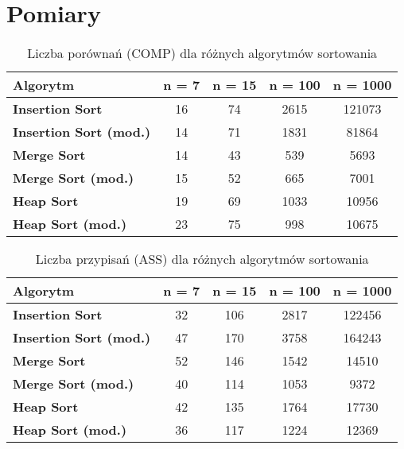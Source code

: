 \documentclass{article}
\begin{document}
\section{Pomiary}


\begin{table}[!ht]
\centering
\small
\caption{Liczba porównań (COMP) dla różnych algorytmów sortowania}
\begin{tabular}{|l|c|c|c|c|}
\hline
\textbf{Algorytm} & \textbf{n = 7} & \textbf{n = 15} & \textbf{n = 100} & \textbf{n = 1000} \\ \hline
\textbf{Insertion Sort} & 16 & 74 & 2615 & 121073 \\ \hline
\textbf{Insertion Sort (mod.)} & 14 & 71 & 1831 & 81864 \\ \hline
\textbf{Merge Sort} & 14 & 43 & 539 & 5693 \\ \hline
\textbf{Merge Sort (mod.)} & 15 & 52 & 665 & 7001 \\ \hline
\textbf{Heap Sort} & 19 & 69 & 1033 & 10956 \\ \hline
\textbf{Heap Sort (mod.)} & 23 & 75 & 998 & 10675 \\ \hline
\end{tabular}
\end{table}

\begin{table}[h!]
\centering
\small
\caption{Liczba przypisań (ASS) dla różnych algorytmów sortowania}
\begin{tabular}{|l|c|c|c|c|}
\hline
\textbf{Algorytm} & \textbf{n = 7} & \textbf{n = 15} & \textbf{n = 100} & \textbf{n = 1000} \\ \hline
\textbf{Insertion Sort} & 32 & 106 & 2817 & 122456 \\ \hline
\textbf{Insertion Sort (mod.)} & 47 & 170 & 3758 & 164243 \\ \hline
\textbf{Merge Sort} & 52 & 146 & 1542 & 14510 \\ \hline
\textbf{Merge Sort (mod.)} & 40 & 114 & 1053 & 9372 \\ \hline
\textbf{Heap Sort} & 42 & 135 & 1764 & 17730 \\ \hline
\textbf{Heap Sort (mod.)} & 36 & 117 & 1224 & 12369 \\ \hline
\end{tabular}
\end{table}
\end{document}
